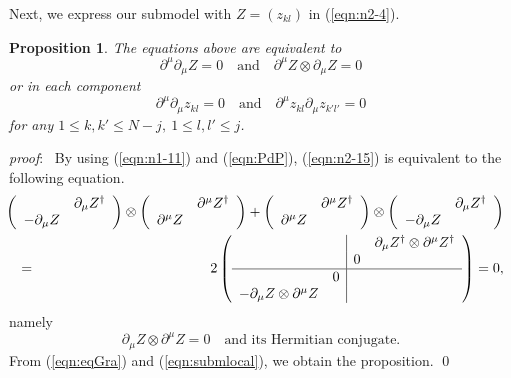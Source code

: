 \documentclass[makeidx,12pt,openany]{report}
\newtheorem{prop}[df]{Proposition}
\begin{document}
Next, we express our submodel with $Z=(z_{kl})$ in (\ref{eqn:n2-4}).
\begin{prop}
The equations above are equivalent to
\begin{equation}
 \partial^{\mu}\partial_{\mu}Z=0 \quad \mbox{and} \quad 
 \partial^{\mu}Z \otimes \partial_{\mu}Z=0
 \label{eqn:n2-16}
\end{equation}
or in each component
\begin{equation}
 \partial^{\mu}\partial_{\mu}z_{kl}=0 \quad \mbox{and} \quad 
 \partial^{\mu}z_{kl}\partial_{\mu}z_{k'l'}=0
 \label{eqn:n2-17}
\end{equation}
for any $1 \le k,k' \le N-j, \ 1 \le l,l' \le j$. 
\end{prop}
\textit{proof}: \ 
By using (\ref{eqn:n1-11}) and (\ref{eqn:PdP}), (\ref{eqn:n2-15}) is 
equivalent to the following equation. 
\begin{eqnarray*}
&& \hspace*{-1cm}
 \left(
 \begin{array}{cc}
                  & \partial_{\mu}Z^{\dag}  \\
 -\partial_{\mu}Z &                         \\
 \end{array}
 \right) \otimes
 \left(
 \begin{array}{cc}
                  & \partial^{\mu}Z^{\dag}  \\
  \partial^{\mu}Z &                         \\
 \end{array}
 \right) +
 \left(
 \begin{array}{cc}
                  & \partial^{\mu}Z^{\dag}  \\
  \partial^{\mu}Z &                         \\
 \end{array}
 \right) \otimes
 \left(
 \begin{array}{cc}
                  & \partial_{\mu}Z^{\dag}  \\
 -\partial_{\mu}Z &                         \\
 \end{array}
 \right) \\
&=& 2
 \left(
 \begin{array}{cc|cc}
   & &   & \partial_{\mu}Z^{\dag} \otimes \partial^{\mu}Z^{\dag} \\
   & & 0 & \\ \hline
   & 0 & & \\
 -\partial_{\mu}Z \otimes \partial^{\mu}Z & & & \\
 \end{array}
 \right) =0, 
\end{eqnarray*}
namely 
\begin{equation}
 \partial_{\mu}Z \otimes \partial^{\mu}Z=0 
 \quad \mbox{and its Hermitian conjugate.} 
 \label{eqn:submlocal}
\end{equation}
{}From (\ref{eqn:eqGra}) and (\ref{eqn:submlocal}), 
we obtain the proposition. \qed 
\end{document}
